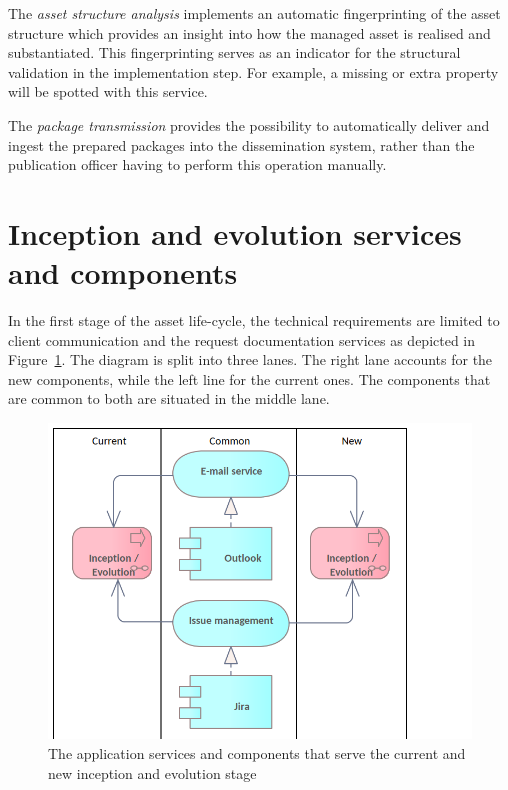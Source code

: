 	The \textit{asset structure analysis} implements an automatic fingerprinting of the asset structure which provides an insight into how the managed asset is realised and substantiated. This fingerprinting serves as an indicator for the structural validation in the implementation step. For example, a missing or extra property will be spotted with this service. 
	
	The \textit{package transmission} provides the possibility to automatically deliver and ingest the prepared packages into the dissemination system, rather than the publication officer having to perform this operation manually. 
	

	
	\section{Inception and evolution services and components}
	\label{sec:evolution-application}
	
	In the first stage of the asset life-cycle, the technical requirements are limited to client communication and the request documentation services as depicted in \mbox{Figure \ref{fig:application-inception-evolution}}. The diagram is split into three lanes. The right lane accounts for the new components, while the left line for the current ones. The components that are common to both are situated in the middle lane. 

	\begin{figure}[h]
		\centering
		\includegraphics[width=.6\textwidth]{images/application/InceptionEvolution.png}
		\caption{The application services and components that serve the current and new inception and evolution stage}
		\label{fig:application-inception-evolution}
	\end{figure}
	
